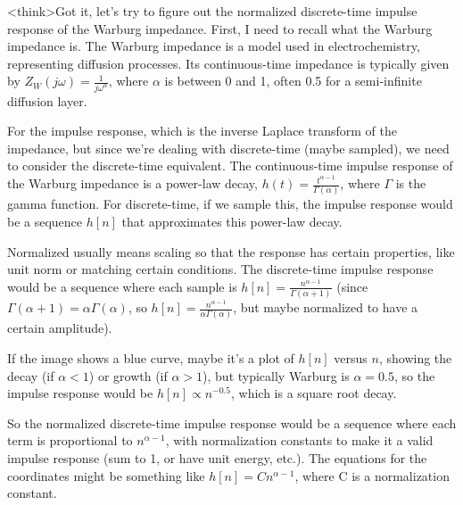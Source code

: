 <think>Got it, let's try to figure out the normalized discrete-time impulse response of the Warburg impedance. First, I need to recall what the Warburg impedance is. The Warburg impedance is a model used in electrochemistry, representing diffusion processes. Its continuous-time impedance is typically given by \( Z_W(j\omega) = \frac{1}{j\omega^{\alpha}} \), where \( \alpha \) is between 0 and 1, often 0.5 for a semi-infinite diffusion layer. 

For the impulse response, which is the inverse Laplace transform of the impedance, but since we're dealing with discrete-time (maybe sampled), we need to consider the discrete-time equivalent. The continuous-time impulse response of the Warburg impedance is a power-law decay, \( h(t) = \frac{t^{\alpha - 1}}{\Gamma(\alpha)} \), where \( \Gamma \) is the gamma function. For discrete-time, if we sample this, the impulse response would be a sequence \( h[n] \) that approximates this power-law decay. 

Normalized usually means scaling so that the response has certain properties, like unit norm or matching certain conditions. The discrete-time impulse response would be a sequence where each sample is \( h[n] = \frac{n^{\alpha - 1}}{\Gamma(\alpha + 1)} \) (since \( \Gamma(\alpha + 1) = \alpha \Gamma(\alpha) \), so \( h[n] = \frac{n^{\alpha - 1}}{\alpha \Gamma(\alpha)} \), but maybe normalized to have a certain amplitude). 

If the image shows a blue curve, maybe it's a plot of \( h[n] \) versus \( n \), showing the decay (if \( \alpha < 1 \)) or growth (if \( \alpha > 1 \)), but typically Warburg is \( \alpha = 0.5 \), so the impulse response would be \( h[n] \propto n^{-0.5} \), which is a square root decay. 

So the normalized discrete-time impulse response would be a sequence where each term is proportional to \( n^{\alpha - 1} \), with normalization constants to make it a valid impulse response (sum to 1, or have unit energy, etc.). The equations for the coordinates might be something like \( h[n] = C n^{\alpha - 1} \), where C is a normalization constant. 

